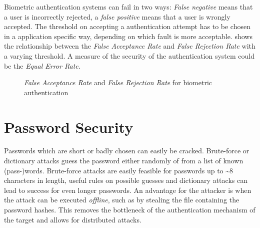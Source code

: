 Biometric authentication systems can fail in two ways: \emph{False negative}
means that a user is incorrectly rejected, a \emph{false positive} means that a
user is wrongly accepted. The threshold on accepting a authentication attempt
has to be chosen in a application specific way, depending on which fault is more
acceptable.  shows the relationship between the \textit{False
Acceptance Rate} and \textit{False Rejection Rate} with a varying threshold. A
measure of the security of the authentication system could be the \textit{Equal
Error Rate}.
\begin{figure}
    \centering
    \caption{\textit{False Acceptance Rate} and \textit{False Rejection Rate}
    for biometric authentication}
    \label{fig:eer}
\end{figure}

\section{Password Security}
Passwords which are short or badly chosen can easily be cracked. Brute-force or
dictionary attacks guess the password either randomly of from a list of known
(pass-)words. Brute-force attacks are easily feasible for passwords up to
\textasciitilde 8 characters in length, useful rules on possible guesses and
dictionary attacks can lead to success for even longer passwords. An advantage
for the attacker is when the attack can be executed \textit{offline}, such as by
stealing the file containing the password hashes. This removes the bottleneck of
the authentication mechanism of the target and allows for distributed attacks.


